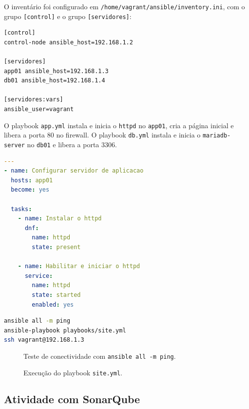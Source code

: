 \documentclass[12pt,a4paper]{article}
\begin{document}
O invent\'ario foi configurado em \texttt{/home/vagrant/ansible/inventory.ini},
com o grupo \texttt{[control]} e o grupo \texttt{[servidores]}:

\begin{lstlisting}[caption={Invent\'ario do Ansible}]
[control]
control-node ansible_host=192.168.1.2

[servidores]
app01 ansible_host=192.168.1.3
db01 ansible_host=192.168.1.4

[servidores:vars]
ansible_user=vagrant
\end{lstlisting}

O playbook \texttt{app.yml} instala e inicia o \texttt{httpd} no \texttt{app01},
cria a p\'agina inicial e libera a porta 80 no firewall. O playbook \texttt{db.yml}
instala e inicia o \texttt{mariadb-server} no \texttt{db01} e libera a porta 3306.

\begin{lstlisting}[language=YAML,caption={Trecho do playbook app.yml}]
---
- name: Configurar servidor de aplicacao
  hosts: app01
  become: yes

  tasks:
    - name: Instalar o httpd
      dnf:
        name: httpd
        state: present

    - name: Habilitar e iniciar o httpd
      service:
        name: httpd
        state: started
        enabled: yes
\end{lstlisting}

\begin{lstlisting}[language=bash,caption={Comandos do Ansible}]
ansible all -m ping
ansible-playbook playbooks/site.yml
ssh vagrant@192.168.1.3
\end{lstlisting}

\begin{figure}[htbp]
  \centering
  \caption{Teste de conectividade com \texttt{ansible all -m ping}.}
\end{figure}

\begin{figure}[htbp]
  \centering
  \caption{Execu\c{c}\~ao do playbook \texttt{site.yml}.}
\end{figure}

\subsection{Atividade com SonarQube}
\end{document}

